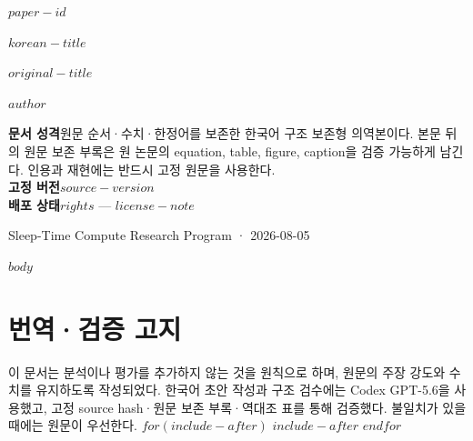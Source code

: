 \documentclass[11pt,a4paper,oneside]{report}
\begin{document}
\begin{titlepage}
\color{stcink}
\vspace*{12mm}
{\sffamily\small\color{stcteal}\MakeUppercase{$paper-id$}\par}
\vspace{7mm}
{\sffamily\bfseries\fontsize{25}{31}\selectfont $korean-title$\par}
\vspace{5mm}
{\Large\itshape $original-title$\par}
\vspace{8mm}
{\large $author$\par}
\vfill
\begin{translationnotice}
\textbf{문서 성격}\quad 원문 순서·수치·한정어를 보존한 한국어 구조 보존형 의역본이다.
본문 뒤의 원문 보존 부록은 원 논문의 equation, table, figure, caption을 검증 가능하게 남긴다. 인용과 재현에는 반드시 고정 원문을 사용한다.\\[1mm]
\textbf{고정 버전}\quad $source-version$\\
\textbf{배포 상태}\quad $rights$ — $license-note$
\end{translationnotice}
\vspace{8mm}
{\small\color{stcblue}Sleep-Time Compute Research Program · 2026-08-05\par}
\end{titlepage}
\tableofcontents
\clearpage
$body$
\clearpage
\chapter*{번역·검증 고지}
이 문서는 분석이나 평가를 추가하지 않는 것을 원칙으로 하며, 원문의 주장 강도와 수치를 유지하도록 작성되었다. 한국어 초안 작성과 구조 검수에는 Codex GPT-5.6을 사용했고, 고정 source hash·원문 보존 부록·역대조 표를 통해 검증했다. 불일치가 있을 때에는 원문이 우선한다.
$for(include-after)$
$include-after$
$endfor$
\end{document}
